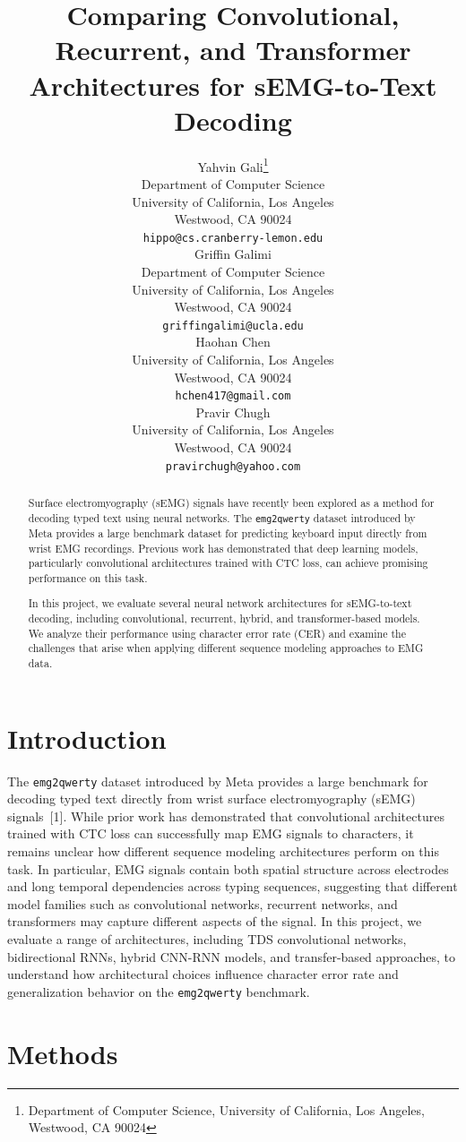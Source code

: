 \documentclass{article}
\title{Comparing Convolutional, Recurrent, and Transformer Architectures for sEMG-to-Text Decoding}
\author{%
  Yahvin Gali\thanks{Department of Computer Science,
  University of California, Los Angeles, Westwood, CA 90024} \\
  Department of Computer Science \\
  University of California, Los Angeles \\
  Westwood, CA 90024 \\
  \texttt{hippo@cs.cranberry-lemon.edu} \\
  \And
  Griffin Galimi\footnotemark[1]\\
  Department of Computer Science \\
  University of California, Los Angeles \\
  Westwood, CA 90024 \\
  \texttt{griffingalimi@ucla.edu} \\
   \AND
   Haohan Chen \\
   University of California, Los Angeles \\
   Westwood, CA 90024 \\
   \texttt{hchen417@gmail.com} \\
   \And
   Pravir Chugh\footnotemark[1]\\
   University of California, Los Angeles \\
   Westwood, CA 90024 \\
   \texttt{pravirchugh@yahoo.com} \\
}
\begin{document}
\maketitle


\begin{abstract}
Surface electromyography (sEMG) signals have recently been explored as a method for decoding typed text using neural networks. The \texttt{emg2qwerty} dataset introduced by Meta provides a large benchmark dataset for predicting keyboard input directly from wrist EMG recordings. Previous work has demonstrated that deep learning models, particularly convolutional architectures trained with CTC loss, can achieve promising performance on this task.

In this project, we evaluate several neural network architectures for sEMG-to-text decoding, including convolutional, recurrent, hybrid, and transformer-based models. We analyze their performance using character error rate (CER) and examine the challenges that arise when applying different sequence modeling approaches to EMG data.
\end{abstract}


\section{Introduction}

The \texttt{emg2qwerty} dataset introduced by Meta provides a large benchmark for decoding typed text directly from wrist surface electromyography (sEMG) signals~[1]. While prior work has demonstrated that convolutional architectures trained with CTC loss can successfully map EMG signals to characters, it remains unclear how different sequence modeling architectures perform on this task. In particular, EMG signals contain both spatial structure across electrodes and long temporal dependencies across typing sequences, suggesting that different model families such as convolutional networks, recurrent networks, and transformers may capture different aspects of the signal. In this project, we evaluate a range of architectures, including TDS convolutional networks, bidirectional RNNs, hybrid CNN-RNN models, and transfer-based approaches, to understand how architectural choices influence character error rate and generalization behavior on the \texttt{emg2qwerty} benchmark.


\section{Methods}
\end{document}
